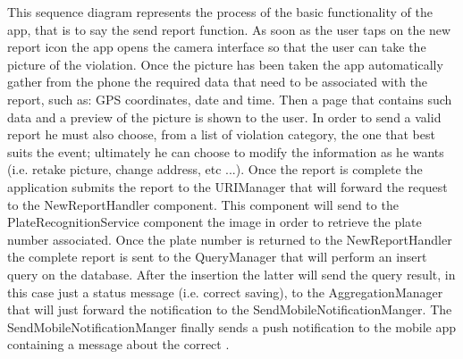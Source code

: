 
This sequence diagram represents the process of the basic functionality of the app, that is to say the send report function. As soon as the user taps on the new report icon the app opens the camera interface so that the user can take the picture of the violation. Once the picture has been taken the app automatically gather from the phone the required data that need to be associated with the report, such as: GPS coordinates, date and time. Then a page that contains such data and a preview of the picture is shown to the user. In order to send a valid report he must also choose, from a list of violation category, the one that best suits the event; ultimately he can choose to modify the information as he wants (i.e. retake picture, change address, etc ...). Once the report is complete the application submits the report to the URIManager that will forward the request to the NewReportHandler component. This component will send to the PlateRecognitionService component the image in order to retrieve the plate number associated. Once the plate number is returned to the NewReportHandler the complete report is sent to the QueryManager that will perform an insert query on the database. After the insertion the latter will send the query result, in this case just a status message (i.e. correct saving), to the AggregationManager that will just forward the notification to the SendMobileNotificationManger. The SendMobileNotificationManger finally sends a push notification to the mobile app containing a message about the correct .
 